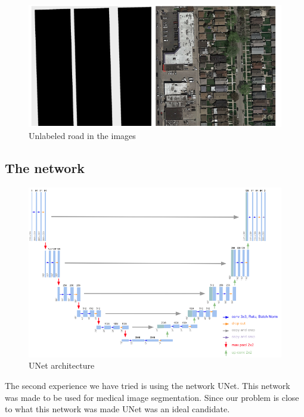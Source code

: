 \documentclass[10pt,conference,compsocconf]{IEEEtran}
\begin{document}
\begin{figure}
  \centering
  \includegraphics[width=\columnwidth]{img/wrongannots.png}
  \caption{Unlabeled road in the images}
  \vspace{-3mm}
  \label{fig:unlabeled}
\end{figure}

\clearpage

\subsection{The network}

\begin{figure}[h]
  \centering
  \includegraphics[width=\columnwidth]{img/unet.png}
  \caption{UNet architecture}
  \label{fig:unet}
\end{figure}

The second experience we have tried is using the network UNet. This network was made to be used for medical image segmentation. Since our problem is close to what this network was made UNet was an ideal candidate.\\
\end{document}
